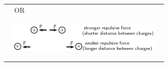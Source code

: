 \begin{center}
\begin{xtabular*}{\mytablewidth}[t]{|p{10\mystarwidth}|p{10\mystarwidth}|p{10\mystarwidth}|}
    
         &
    
    
        OR &
    
    
     \tabularnewline{}
    
    
         &
    
    
        
                    
    \setcounter{subfigure}{0}

\label{m38771*id63056}
    \begin{center}
    \label{m38771*id63056!!!underscore!!!media}\label{m38771*id63056!!!underscore!!!printimage}\includegraphics{col11305.imgs/m38771_PG10C9_005.png} %
        
      \vspace{2pt}
    \vspace{.1in}
    
    \end{center}



    \addtocounter{footnote}{-0}
    
                   &
    
    

\end{xtabular*}
\end{center}
